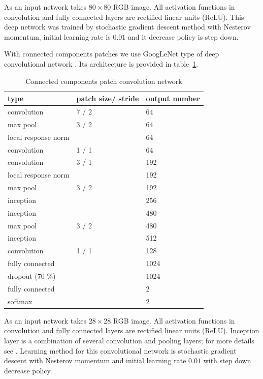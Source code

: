\documentclass[conference,a4paper,twocolumn]{IEEEtran}
\begin{document}
As an input network takes $80\times80$ RGB image. All activation functions in convolution and fully connected layers are rectified linear units (ReLU). This deep network was trained by stochastic gradient descent method with Nesterov momentum, initial learning rate is $0.01$ and it decrease policy is step down.

With connected components patches we use GoogLeNet type of deep convolutional network \cite{Googlenet}. Its architecture is provided in table~\ref{googlenet_tab}. 
\begin{table}[!h]
\centering
\caption{Connected components patch convolution network}
\label{googlenet_tab}
\begin{tabular}{|l|p{1.3cm}|p{1.3cm}|}
\hline
\textbf{type} & \textbf{patch size/ stride} & \textbf{output number}  \\
\hline
convolution & 7 / 2 & 64 \\
\hline
max pool & 3 / 2 & 64 \\
\hline
local response norm & & 64 \\
\hline
convolution & 1 / 1 & 64 \\
\hline
convolution & 3 / 1 & 192 \\
\hline
local response norm & & 192 \\
\hline
max pool & 3 / 2 & 192 \\
\hline
inception &  & 256 \\
\hline
inception &  & 480 \\
\hline
max pool & 3 / 2 & 480 \\
\hline
inception &  & 512 \\
\hline
convolution & 1 / 1 & 128 \\
\hline
fully connected & & 1024 \\
\hline
dropout (70 \%) & & 1024 \\
\hline
fully connected & & 2 \\
\hline
softmax & & 2 \\
\hline
\end{tabular}
\end{table}

As an input network takes $28\times28$ RGB image. All activation functions in convolution and fully connected layers are rectified linear units (ReLU). Inception layer is a combination of several convolution and pooling layers; for more details see \cite{Googlenet}. Learning method for this convolutional network is stochastic gradient descent with Nesterov momentum and initial learning rate $0.01$ with step down decrease policy. 
\end{document}
